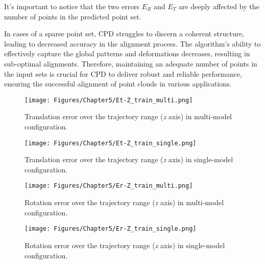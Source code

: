 It's important to notice that the two errors $E_R$ and $E_T$ are deeply affected by the number of points in the predicted point set.

In cases of a sparse point set, CPD struggles to discern a coherent structure, leading to decreased accuracy in the alignment process. The algorithm's ability to effectively capture the global patterns and deformations decreases, resulting in sub-optimal alignments. Therefore, maintaining an adequate number of points in the input sets is crucial for CPD to deliver robust and reliable performance, ensuring the successful alignment of point clouds in various applications.
\begin{figure}[H]
    \centering
    \texttt{[image: Figures/Chapter5/Et-Z\_train\_multi.png]}
    \caption[Translation error in multi-model configuration.]{Translation error over the trajectory range (\textit{z} axis) in multi-model configuration.}
    \label{fig:Et-Z train multi}
\end{figure}
\begin{figure}[H]
    \centering
    \texttt{[image: Figures/Chapter5/Et-Z\_train\_single.png]}
    \caption[Translation error in single-model configuration.]{Translation error over the trajectory range (\textit{z} axis) in single-model configuration.}
    \label{fig:Et-Z train single}
\end{figure}

\newpage
\begin{figure}[H]
    \centering
    \texttt{[image: Figures/Chapter5/Er-Z\_train\_multi.png]}
    \caption[Rotation error in single-model configuration.]{Rotation error over the trajectory range (\textit{z} axis) in multi-model configuration.}
    \label{fig:Er-Z train multi}
\end{figure}
\begin{figure}[H]
    \centering
    \texttt{[image: Figures/Chapter5/Er-Z\_train\_single.png]}
    \caption[Rotation error in single-model configuration.]{Rotation error over the trajectory range (\textit{z} axis) in single-model configuration.}
    \label{fig:Er-Z train single}
\end{figure}

